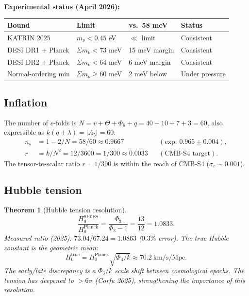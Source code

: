 \documentclass[12pt,a4paper]{article}
\newtheorem{theorem}{Theorem}[section]
\theoremstyle{definition}
\newcommand{\Phithree}{\Phi_3}
\newcommand{\Phisix}{\Phi_6}
\begin{document}
\noindent\textbf{Experimental status (April 2026):}
\begin{center}
\small
\begin{tabular}{@{}llll@{}}
\toprule
\textbf{Bound} & \textbf{Limit} & \textbf{vs.\ 58 meV} & \textbf{Status} \\
\midrule
KATRIN 2025 & $m_\nu<0.45$ eV & $\ll$ limit & Consistent \\
DESI DR1 + Planck & $\Sigma m_\nu<73$ meV & 15 meV margin & Consistent \\
DESI DR2 + Planck & $\Sigma m_\nu<64$ meV & 6 meV margin & Consistent \\
Normal-ordering min & $\Sigma m_\nu\ge 60$ meV & 2 meV below & Under pressure \\
\bottomrule
\end{tabular}
\end{center}

\subsection{Inflation}

The number of $e$-folds is $N=v+\Theta+\Phisix+q = 40+10+7+3 = 60$,
also expressible as $k(q+\lambda)=|A_5|=60$.
\begin{align}
  n_s &= 1-2/N = 58/60 \approx 0.9667 &&(\text{exp: }0.965\pm 0.004),\\
  r &= k/N^2 = 12/3600 = 1/300 \approx 0.0033 &&(\text{CMB-S4 target}).
\end{align}
The tensor-to-scalar ratio $r=1/300$ is within the reach of
CMB-S4 ($\sigma_r\sim 0.001$).

\subsection{Hubble tension}

\begin{theorem}[Hubble tension resolution]
\begin{equation}
  \frac{H_0^{\mathrm{SH0ES}}}{H_0^{\mathrm{Planck}}}
  = \frac{\Phithree}{\Phithree-1} = \frac{13}{12} = 1.0833.
\end{equation}
Measured ratio (2025): $73.04/67.24 = 1.0863$ ($0.3\%$ error).
The true Hubble constant is the geometric mean:
\begin{equation}
  H_0^{\mathrm{true}} = H_0^{\mathrm{Planck}}\sqrt{\Phithree/k}
  \approx 70.2~\text{km/s/Mpc}.
\end{equation}
The early/late discrepancy is a $\Phithree/k$ scale shift between
cosmological epochs.  The tension has deepened to $>6\sigma$
(Corfu 2025), strengthening the importance of this resolution.
\end{theorem}
\end{document}
